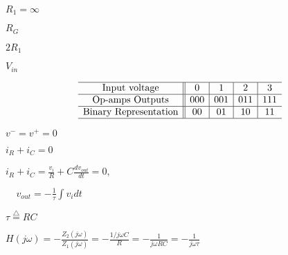 \documentclass{article}
\def\lthtmlcheckvsize{\ifdim\ht\sizebox<\vsize 
  \ifdim\wd\sizebox<\hsize\expandafter\hfill\fi \expandafter\vfill
  \else\expandafter\vss\fi}%
\begin{document}
{\newpage\clearpage
{}%
$ R_1=\infty$%
\lthtmlindisplaymathZ
\lthtmlcheckvsize\clearpage}

{\newpage\clearpage
{}%
$ R_G$%
\lthtmlindisplaymathZ
\lthtmlcheckvsize\clearpage}

{\newpage\clearpage
{}%
$ 2R_1$%
\lthtmlindisplaymathZ
\lthtmlcheckvsize\clearpage}

{\newpage\clearpage
{}%
$ V_{in}$%
\lthtmlindisplaymathZ
\lthtmlcheckvsize\clearpage}

{\newpage\clearpage
{}%
\begin{displaymath}\begin{array}{c||c|c|c|c}\hline
\mbox{Input voltage}        & 0 	& 1	& 2	& 3	\\\hline
\mbox{Op-amps Outputs}	& 000	& 001	& 011	& 111	\\\hline
\mbox{Binary Representation}	& 00	& 01	& 10	& 11	\\\hline
\end{array}\end{displaymath}%
\lthtmldisplayZ
\lthtmlcheckvsize\clearpage}

{\newpage\clearpage
{}%
$ v^-=v^+=0$%
\lthtmlindisplaymathZ
\lthtmlcheckvsize\clearpage}

{\newpage\clearpage
{}%
$ i_R+i_C=0$%
\lthtmlindisplaymathZ
\lthtmlcheckvsize\clearpage}

{\newpage\clearpage
{}%
$\displaystyle i_R+i_C=\frac{v_i}{R}+C\frac{d v_{out}}{dt}=0,
\;\;\;\;$%
\lthtmlindisplaymathZ
\lthtmlcheckvsize\clearpage}

{\newpage\clearpage
{}%
$\displaystyle \;\;\;\;v_{out}=-\frac{1}{\tau} \int v_i dt$%
\lthtmlindisplaymathZ
\lthtmlcheckvsize\clearpage}

{\newpage\clearpage
{}%
$ \tau \stackrel{\triangle}{=}RC$%
\lthtmlindisplaymathZ
\lthtmlcheckvsize\clearpage}

{\newpage\clearpage
{}%
$\displaystyle H(j\omega)=-\frac{Z_2(j\omega)}{Z_1(j\omega)}=-\frac{1/j\omega C}{R}
=-\frac{1}{j\omega RC}=-\frac{1}{j\omega \tau}$%
\lthtmlindisplaymathZ
\lthtmlcheckvsize\clearpage}
\end{document}
